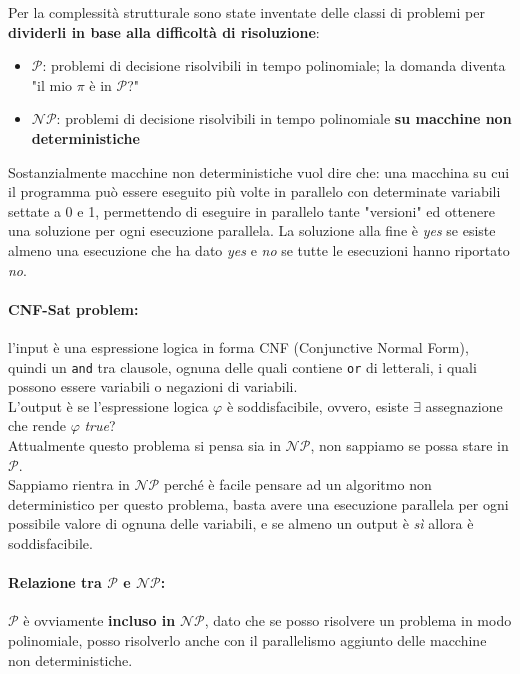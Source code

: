 Per la complessità strutturale sono state inventate delle classi di problemi per \textbf{dividerli in base alla difficoltà di risoluzione}: 
\begin{itemize}
	\item $\mathcal{P}$: problemi di decisione risolvibili in tempo polinomiale; la domanda diventa "il mio $\pi$ è in $\mathcal{P}$?"
	\item $\mathcal{NP}$: problemi di decisione risolvibili in tempo polinomiale \textbf{su macchine non deterministiche} 
\end{itemize}

Sostanzialmente macchine non deterministiche vuol dire che: una macchina su cui il programma può essere eseguito più volte in parallelo con determinate variabili settate a 0 e 1, permettendo di eseguire in parallelo tante "versioni" ed ottenere una soluzione per ogni esecuzione parallela. La soluzione alla fine è \textit{yes} se esiste almeno una esecuzione che ha dato \textit{yes} e \textit{no} se tutte le esecuzioni hanno riportato \textit{no}. \\

\paragraph{CNF-Sat problem:} l'input è una espressione logica in forma CNF (Conjunctive Normal Form), quindi un \texttt{and} tra clausole, ognuna delle quali contiene \texttt{or} di letterali, i quali possono essere variabili o negazioni di variabili.\\

L'output è se l'espressione logica $\varphi$ è soddisfacibile, ovvero, esiste $\exists$ assegnazione che rende $\varphi$ \textit{true}? \\
Attualmente questo problema si pensa sia in $\mathcal{NP}$, non sappiamo se possa stare in $\mathcal{P}$.\\

Sappiamo rientra in $\mathcal{NP}$ perché è facile pensare ad un algoritmo non deterministico per questo problema, basta avere una esecuzione parallela per ogni possibile valore di ognuna delle variabili, e se almeno un output è \textit{sì} allora è soddisfacibile.\\

\newpage

\paragraph{Relazione tra $\mathcal{P}$ e $\mathcal{NP}$:} $\mathcal{P}$ è ovviamente \textbf{incluso in} $\mathcal{NP}$, dato che se posso risolvere un problema in modo polinomiale, posso risolverlo anche con il parallelismo aggiunto delle macchine non deterministiche.\\


